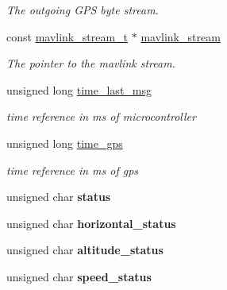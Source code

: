 \begin{DoxyCompactItemize}
\begin{DoxyCompactList}\small\item\em The outgoing G\+P\+S byte stream. \end{DoxyCompactList}\item 
\hypertarget{structgps__t_a6106d5efb380f6db99175dcef0aa561c}{const \hyperlink{structmavlink__stream__t}{mavlink\+\_\+stream\+\_\+t} $\ast$ \hyperlink{structgps__t_a6106d5efb380f6db99175dcef0aa561c}{mavlink\+\_\+stream}}\label{structgps__t_a6106d5efb380f6db99175dcef0aa561c}

\begin{DoxyCompactList}\small\item\em The pointer to the mavlink stream. \end{DoxyCompactList}\item 
\hypertarget{structgps__t_ad64632898a274bd2f5c71c41272e78b2}{unsigned long \hyperlink{structgps__t_ad64632898a274bd2f5c71c41272e78b2}{time\+\_\+last\+\_\+msg}}\label{structgps__t_ad64632898a274bd2f5c71c41272e78b2}

\begin{DoxyCompactList}\small\item\em time reference in ms of microcontroller \end{DoxyCompactList}\item 
\hypertarget{structgps__t_a4ad6a73828ba831806d3f439d404db4c}{unsigned long \hyperlink{structgps__t_a4ad6a73828ba831806d3f439d404db4c}{time\+\_\+gps}}\label{structgps__t_a4ad6a73828ba831806d3f439d404db4c}

\begin{DoxyCompactList}\small\item\em time reference in ms of gps \end{DoxyCompactList}\item 
\hypertarget{structgps__t_a65e6af7b99e16e7fe1871c1d31b2e0ee}{unsigned char {\bfseries status}}\label{structgps__t_a65e6af7b99e16e7fe1871c1d31b2e0ee}

\item 
\hypertarget{structgps__t_a7feb3de9f88da78aae0b89ba5117bfea}{unsigned char {\bfseries horizontal\+\_\+status}}\label{structgps__t_a7feb3de9f88da78aae0b89ba5117bfea}

\item 
\hypertarget{structgps__t_a9e87626c65f6e709794aa72a595c37d9}{unsigned char {\bfseries altitude\+\_\+status}}\label{structgps__t_a9e87626c65f6e709794aa72a595c37d9}

\item 
\hypertarget{structgps__t_a02084ea64a586fb27d0ab191dc2fd1fc}{unsigned char {\bfseries speed\+\_\+status}}\label{structgps__t_a02084ea64a586fb27d0ab191dc2fd1fc}


\end{DoxyCompactItemize}
